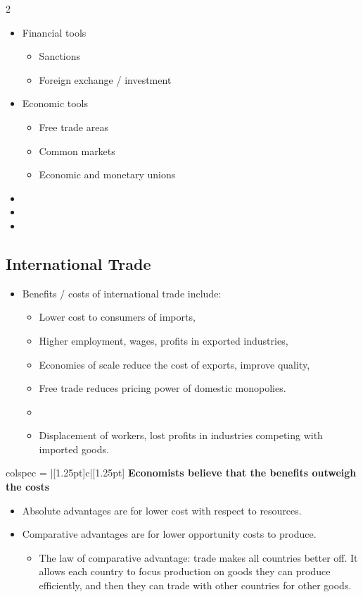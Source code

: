 \documentclass[../notes_compiled.tex]{subfiles}
\begin{document}
\begin{itemize}
\begin{multicols}{2}
\begin{itemize}
\item Financial tools
\begin{itemize}
\item Sanctions
\item Foreign exchange / investment
\end{itemize}
\item Economic tools
\begin{itemize}
\item Free trade areas
\item Common markets
\item Economic and monetary unions
\end{itemize}
\item[]
\item[]
\item[]
\end{itemize}
\end{multicols}
\end{itemize}

\subsection{International Trade}
\begin{itemize}
\item Benefits / costs of international trade include:
\begin{itemize}
\item[+] Lower cost to consumers of imports,
\item[+] Higher employment, wages, profits in exported industries,
\item[+] Economies of scale reduce the cost of exports, improve quality,
\item[+] Free trade reduces pricing power of domestic monopolies.
\item[] 
\item[--] Displacement of workers, lost profits in industries competing with imported goods.
\end{itemize}
\end{itemize}
\vspace{-.25cm}
\begin{table}[H]
\centering
\begin{tblr}{colspec = {|[1.25pt]c|[1.25pt]}}
\hline[1.25pt]
\textbf{Economists believe that the benefits outweigh the costs} \\ \hline[1.25pt]
\end{tblr}
\end{table}
\begin{itemize}
\item Absolute advantages are for lower cost with respect to resources.
\item Comparative advantages are for lower opportunity costs to produce.
\begin{itemize}
\item The law of comparative advantage: trade makes all countries better off. It allows each country to focus production on goods they can produce efficiently, and then they can trade with other countries for other goods.
\end{itemize}
\end{itemize}
\end{document}
